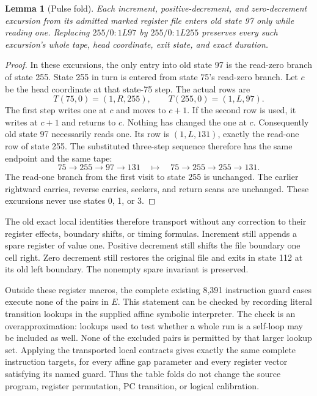 \documentclass[11pt]{article}
\newtheorem{lemma}{Lemma}
\begin{document}
\begin{lemma}[Pulse fold]\label{lem:pulse}
Each increment, positive-decrement, and zero-decrement excursion from
its admitted marked register file enters old state 97 only while reading
one. Replacing $255/0:1L97$ by $255/0:1L255$ preserves every such excursion's
whole tape, head coordinate, exit state, and exact duration.
\end{lemma}
\begin{proof}
In these excursions, the only entry into old state 97 is the read-zero
branch of state 255. State 255 in turn is entered from state 75's
read-zero branch. Let $c$ be the head coordinate at that state-75 step.
The actual rows are
\[
 T(75,0)=(1,R,255),\qquad T(255,0)=(1,L,97).
\]
The first step writes one at $c$ and moves to $c+1$. If the second row
is used, it writes at $c+1$ and returns to $c$. Nothing has changed the
one at $c$. Consequently old state 97 necessarily reads one. Its row
is $(1,L,131)$, exactly the read-one row of state 255. The substituted
three-step sequence therefore has the same endpoint and the same tape:
\[
 75\to255\to97\to131
 \quad\longmapsto\quad
 75\to255\to255\to131.
\]
The read-one branch from the first visit to state 255 is unchanged.
The earlier rightward carries, reverse carries, seekers, and return scans
are unchanged. These excursions never use states 0, 1, or 3.
\end{proof}

The old exact local identities therefore transport without any correction
to their register effects, boundary shifts, or timing formulas. Increment
still appends a spare register of value one. Positive decrement still
shifts the file boundary one cell right. Zero decrement still restores
the original file and exits in state 112 at its old left boundary. The
nonempty spare invariant is preserved.

Outside these register macros, the complete existing 8,391 instruction
guard cases execute none of the pairs in $E$. This statement can be
checked by recording literal transition lookups in the supplied affine
symbolic interpreter. The check is an overapproximation: lookups used to
test whether a whole run is a self-loop may be included as well. None
of the excluded pairs is permitted by that larger lookup set. Applying
the transported local contracts gives exactly the same complete
instruction targets, for every affine gap parameter and every register
vector satisfying its named guard. Thus the table folds do not change
the source program, register permutation, PC transition, or logical
calibration.
\end{document}
